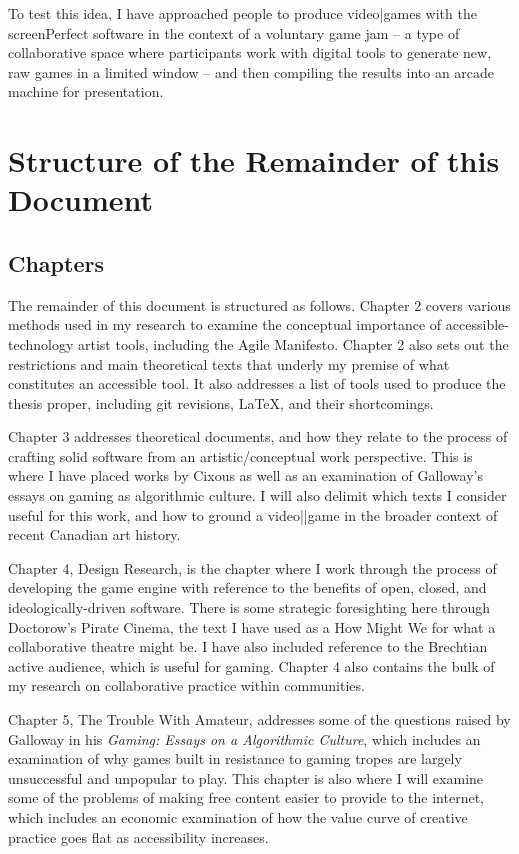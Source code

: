 To test this idea, I have approached people to produce video|games with the screenPerfect software in the context of a voluntary game jam – a type of collaborative space where participants work with digital tools to generate new, raw games in a limited window – and then compiling the results into an arcade machine for presentation. 


\section{Structure of the Remainder of this Document}

\subsection{Chapters}
The remainder of this document is structured as follows. Chapter 2 covers various methods used in my research to examine the conceptual importance of accessible-technology artist tools, including the Agile Manifesto. Chapter 2 also sets out the restrictions and main theoretical texts that underly my premise of what constitutes an accessible tool. It also addresses a list of tools used to produce the thesis proper, including git revisions, LaTeX, and their shortcomings. 

Chapter 3 addresses theoretical documents, and how they relate to the process of crafting solid software from an artistic/conceptual work perspective. This is where I have placed works by Cixous as well as an examination of Galloway's essays on gaming as algorithmic culture. I will also delimit which texts I consider useful for this work, and how to ground a video||game in the broader context of recent Canadian art history.

Chapter 4, Design Research, is the chapter where I work through the process of developing the game engine with reference to the benefits of open, closed, and ideologically-driven software. There is some strategic foresighting here through Doctorow's Pirate Cinema, the text I have used as a How Might We for what a collaborative theatre might be. I have also included reference to the Brechtian active audience, which is useful for gaming. Chapter 4 also contains the bulk of my research on collaborative practice within communities.

Chapter 5, The Trouble With Amateur, addresses some of the questions raised by Galloway in his \textit{Gaming: Essays on a Algorithmic Culture}, which includes an examination of why games built in resistance to gaming tropes are largely unsuccessful and unpopular to play. This chapter is also where I will examine some of the problems of making free content easier to provide to the internet, which includes an economic examination of how the value curve of creative practice goes flat as accessibility increases.

